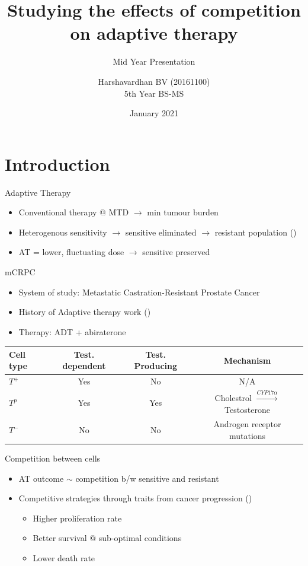 \documentclass[aspectratio=169,9pt]{beamer}
\title{Studying the effects of competition on adaptive therapy}
\subtitle{Mid Year Presentation}
\author{Harshavardhan BV (20161100)\\ 5th Year BS-MS}
\date{January 2021}
\institute{Under the guidance of Prof. Sutirth Dey,\\ IISER Pune}
\begin{document}
\frame{\titlepage}

\section{Introduction}
\begin{frame}{Adaptive Therapy}
  \begin{itemize}
    \item Conventional therapy @ MTD $\rightarrow$ min tumour burden
    \item Heterogenous sensitivity $\rightarrow$ sensitive eliminated $\rightarrow$ resistant population (\cite{Scott})
    \item AT = lower, fluctuating dose $\rightarrow$ sensitive preserved
  \end{itemize}
\end{frame}

\begin{frame}{mCRPC}
  \begin{itemize}
    \item System of study: Metastatic Castration-Resistant Prostate Cancer
    \item History of Adaptive therapy work (\cite{Cunningham})
    \item Therapy: ADT + abiraterone
  \end{itemize}
  \begin{table}
    \centering
    \begin{tabular}{|l|c|c|c|}
    \hline
    Cell type & Test. dependent & Test. Producing & Mechanism \\
    \hline
    $T^+$ & Yes & No & N/A \\
    $T^p$ & Yes & Yes & Cholestrol $\xrightarrow{CYP17\alpha}$ Testosterone\\
    $T^-$ & No & No & Androgen receptor mutations\\
    \hline
    \end{tabular}
  \end{table}
\end{frame}

\begin{frame}{Competition between cells}
  \begin{itemize}
    \item AT outcome $\sim$ competition b/w sensitive and resistant
    \item Competitive strategies through traits from cancer progression (\cite{Hanahan})
    \begin{itemize}
      \item Higher proliferation rate
      \item Better survival @ sub-optimal conditions
      \item Lower death rate
    \end{itemize}
  \end{itemize}
\end{frame}
\end{document}
